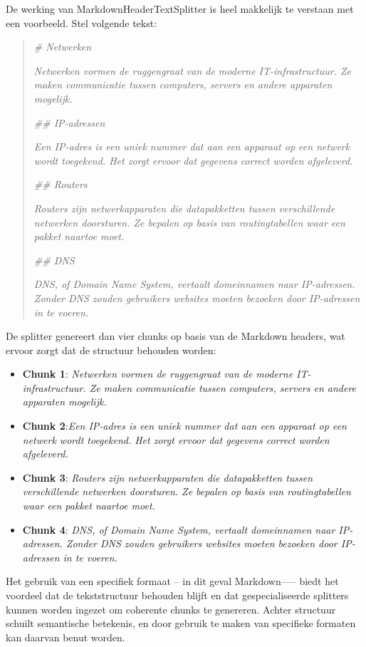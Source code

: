 De werking van MarkdownHeaderTextSplitter is heel makkelijk te verstaan met een voorbeeld. Stel volgende tekst:

\begin{quote}
    \emph{\# Netwerken}
    
    \emph{Netwerken vormen de ruggengraat van de moderne IT-infrastructuur. Ze maken communicatie tussen computers, servers en andere apparaten mogelijk.}
    
    \emph{\#\# IP-adressen}
    
    \emph{Een IP-adres is een uniek nummer dat aan een apparaat op een netwerk wordt toegekend. Het zorgt ervoor dat gegevens correct worden afgeleverd.}
    
    \emph{\#\# Routers}
    
    \emph{Routers zijn netwerkapparaten die datapakketten tussen verschillende netwerken doorsturen. Ze bepalen op basis van routingtabellen waar een pakket naartoe moet.}
    
    \emph{\#\# DNS}
    
    \emph{DNS, of Domain Name System, vertaalt domeinnamen naar IP-adressen. Zonder DNS zouden gebruikers websites moeten bezoeken door IP-adressen in te voeren.}
\end{quote}

De splitter genereert dan vier chunks op basis van de Markdown headers, wat ervoor zorgt dat de structuur behouden worden:

\begin{itemize}
    \item \textbf{Chunk 1}: \emph{Netwerken vormen de ruggengraat van de moderne IT-infrastructuur. Ze maken communicatie tussen computers, servers en andere apparaten mogelijk.}
    \item \textbf{Chunk 2}:\emph{Een IP-adres is een uniek nummer dat aan een apparaat op een netwerk wordt toegekend. Het zorgt ervoor dat gegevens correct worden afgeleverd.}
    \item \textbf{Chunk 3}: \emph{Routers zijn netwerkapparaten die datapakketten tussen verschillende netwerken doorsturen. Ze bepalen op basis van routingtabellen waar een pakket naartoe moet.}
    \item \textbf{Chunk 4}: \emph{DNS, of Domain Name System, vertaalt domeinnamen naar IP-adressen. Zonder DNS zouden gebruikers websites moeten bezoeken door IP-adressen in te voeren.}
\end{itemize}

Het gebruik van een specifiek formaat -- in dit geval Markdown--— biedt het voordeel dat de tekststructuur behouden blijft en dat gespecialiseerde splitters kunnen worden ingezet om coherente chunks te genereren. Achter structuur schuilt semantische betekenis, en door gebruik te maken van specifieke formaten kan daarvan benut worden.

